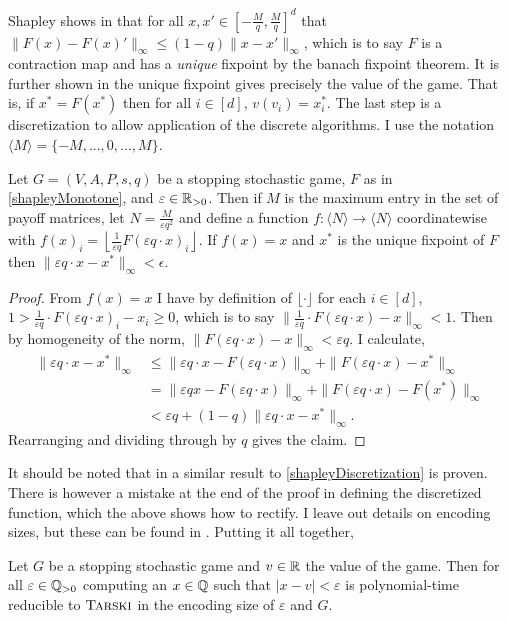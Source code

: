 Shapley shows in \citep{shapley} that for all $x, x' \in [-\frac{M}{q}, \frac{M}{q}]^d$ 
that $\|F(x) - F(x)'\|_\infty \leq (1 - q) \|x - x'\|_\infty$,
which is to say $F$ is a contraction map and has a \emph{unique} fixpoint by the banach fixpoint theorem. 
It is further shown in \citep{shapley} the unique fixpoint gives precisely the value of the game. That is, 
if $x^* = F(x^*)$ then
for all $i \in [d]$, $v(v_i) = x^*_i$. The last step is a discretization to allow application
of the discrete algorithms. I
use the notation $\langle M \rangle = \{-M, ..., 0, ..., M\}$. 
\newcommand{\angm}{\langle M \rangle}
\begin{lemma} \label{shapleyDiscretization}
  Let $G = (V, A, P, s, q)$ be a stopping stochastic game, $F$ as in \cref{shapleyMonotone}, 
  and $\varepsilon \in \mathbb{R}_{> 0}$. Then if $M$ is the maximum entry in the set of payoff matrices, let 
  $N = \frac{M}{\varepsilon q^2}$ and define a function $f : \langle N \rangle \to \langle N \rangle$ coordinatewise with
  $f(x)_i = \left\lfloor \frac{1}{\varepsilon q} F(\varepsilon q \cdot x)_i \right\rfloor$. If $f(x) = x$
  and $x^*$ is the unique fixpoint of $F$ then $\|\varepsilon q \cdot x - x^*\|_\infty < \epsilon$.
\end{lemma}
\begin{proof}
  From $f(x) = x$ I have by definition of $\lfloor \cdot \rfloor$ for each $i \in [d]$,
  $1 > \frac{1}{\varepsilon q} \cdot F(\varepsilon q \cdot x)_i - x_i \geq 0$, which is to say
  $\|\frac{1}{\varepsilon q} \cdot F(\varepsilon q \cdot x) - x\|_\infty < 1$. Then by homogeneity of the norm,
  $\|F(\varepsilon q \cdot x) - x\|_\infty < \varepsilon q$. I calculate,
  \begin{align*}
    \|\varepsilon q \cdot x - x^* \|_\infty &\leq \|\varepsilon q \cdot x - F(\varepsilon q \cdot x) \|_\infty
                                           + \| F(\varepsilon q \cdot x) - x^* \|_\infty \\
                                      &=  \|\varepsilon q x - F(\varepsilon q \cdot x) \|_\infty
                                        +  \| F(\varepsilon q \cdot x) - F(x^*) \|_\infty \\
                                      &< \varepsilon q + (1 - q)\| \varepsilon q \cdot x - x^* \|_\infty.
  \end{align*}
  Rearranging and dividing through by $q$ gives the claim.
\end{proof}
It should be noted that in \citep[Proposition 6.2.]{lowerBound} a similar result to \cref{shapleyDiscretization} 
is proven. There is however a mistake at the end of the proof in defining the discretized function, which the above
shows how to rectify.
I leave out details on encoding sizes, but these can be found in \citep{lowerBound}.
Putting it all together,
\begin{theorem}
  Let $G$ be a stopping stochastic game and $v \in \mathbb{R}$ the value of the game. Then for all $\varepsilon \in \mathbb{Q}_{> 0}$
  computing 
  an $x \in \mathbb{Q}$ such that $|x - v| < \varepsilon$ is polynomial-time reducible to $\textsc{Tarski}$ in the encoding size
  of $\varepsilon$ and $G$.
\end{theorem}
